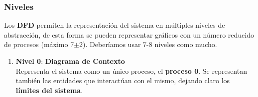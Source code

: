 \subsubsection{Niveles}
Los \textbf{DFD} permiten la representación del sistema en múltiples niveles de abstracción, de esta forma se pueden representar gráficos con un número reducido de procesos (máximo 7$\pm$2). Deberíamos usar 7-8 niveles como mucho.
\begin{enumerate}
    \item \textbf{Nivel 0}: \textbf{Diagrama de Contexto}\\
    Representa el sistema como un único proceso, el \textbf{proceso 0}. Se representan también las entidades que interactúan con el mismo, dejando claro los \textbf{límites del sistema}.
    

\end{enumerate}
